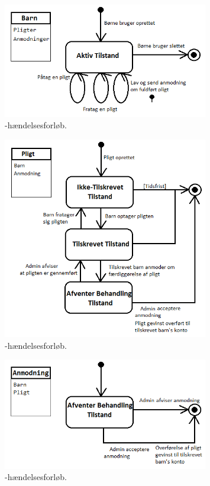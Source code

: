 \begin{figure}[H]
\centering
\includegraphics[width=0.8\textwidth]{Billeder/BoernForloeb.png}
\caption{-hændelsesforløb.}
\label{BarnHaendelsesforloeb}
\end{figure}

\begin{figure}[H]
\centering
\includegraphics[width=0.8\textwidth]{Billeder/PligtForloeb.png}
\caption{-hændelsesforløb.}
\label{PligtHaendelsesforloeb}
\end{figure}

\begin{figure}[H]
\centering
\includegraphics[width=0.8\textwidth]{Billeder/AnmodningForloeb.png}
\caption{-hændelsesforløb.}
\label{AnmodningHaendelsesforloeb}
\end{figure}
